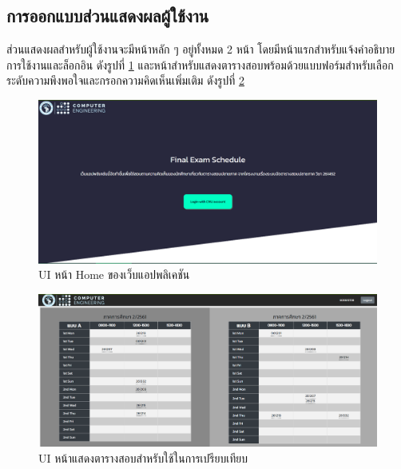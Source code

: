 \subsection{การออกแบบส่วนแสดงผลผู้ใช้งาน}
ส่วนแสดงผลสำหรับผู้ใช้งานจะมีหน้าหลัก ๆ อยู่ทั้งหมด 2 หน้า โดยมีหน้าแรกสำหรับแจ้งคำอธิบายการใช้งานและล็อกอิน ดังรูปที่ \ref{fig:eval_ui_1}
และหน้าสำหรับแสดงตารางสอบพร้อมด้วยแบบฟอร์มสำหรับเลือกระดับความพึงพอใจและกรอกความคิดเห็นเพิ่มเติม ดังรูปที่ \ref{fig:eval_ui_2}
\begin{figure}
    \begin{center}
      \includegraphics[width=\linewidth]{images/eval_ui_1.png}
    \end{center}
    \caption[UI หน้า Home ของเว็บแอปพลิเคชัน]{UI หน้า Home ของเว็บแอปพลิเคชัน}
    \label{fig:eval_ui_1}     
\end{figure}
\begin{figure}
    \begin{center}
      \includegraphics[width=\linewidth]{images/eval_ui_2.png}
    \end{center}
    \caption[UI หน้าแสดงตารางสอบสำหรับใช้ในการเปรียบเทียบ]{UI หน้าแสดงตารางสอบสำหรับใช้ในการเปรียบเทียบ}
    \label{fig:eval_ui_2}     
\end{figure}

